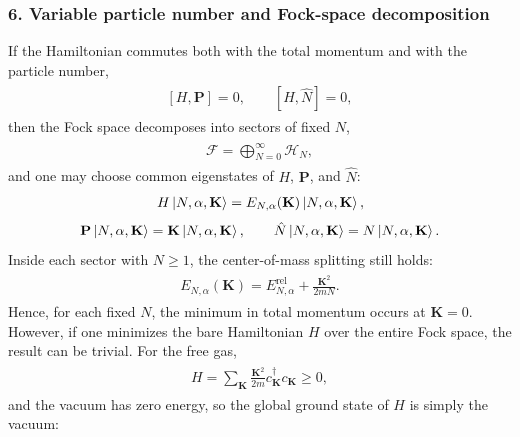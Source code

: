\documentclass[../QFT_main.tex]{subfiles}
\begin{document}
\subsubsection*{6. Variable particle number and Fock-space decomposition}
If the Hamiltonian commutes both with the total momentum and with the particle number,
{\small\begin{align}
\begin{aligned}
    [H,\mathbf{P}]=0,\qquad [H,\hat N]=0,
\end{aligned}
\end{align}}
then the Fock space decomposes into sectors of fixed $N$,
{\small\begin{align}
\begin{aligned}
    \mathcal F=\bigoplus_{N=0}^{\infty}\mathcal H_N,
\end{aligned}
\end{align}}
and one may choose common eigenstates of $H$, $\mathbf{P}$, and $\hat N$:
{\small\begin{align}
\begin{aligned}
    H\ket{N,\alpha,\mathbf{K}}=E_{N,\alpha}(\mathbf{K})\ket{N,\alpha,\mathbf{K}},
\end{aligned}
\end{align}}
{\small\begin{align}
\begin{aligned}
    \mathbf{P}\ket{N,\alpha,\mathbf{K}}=\mathbf{K}\ket{N,\alpha,\mathbf{K}},\qquad \hat N\ket{N,\alpha,\mathbf{K}}=N\ket{N,\alpha,\mathbf{K}}.
\end{aligned}
\end{align}}
Inside each sector with $N\geq 1$, the center-of-mass splitting still holds:
{\small\begin{align}
\begin{aligned}
    E_{N,\alpha}(\mathbf{K})=E^{\text{rel}}_{N,\alpha}+\frac{\mathbf{K}^2}{2mN}.
\end{aligned}
\end{align}}
Hence, for each fixed $N$, the minimum in total momentum occurs at $\mathbf{K}=0$.
However, if one minimizes the bare Hamiltonian $H$ over the entire Fock space, the result can be trivial.
For the free gas,
{\small\begin{align}
\begin{aligned}
    H=\sum_{\mathbf{K}}\frac{\mathbf{K}^2}{2m}c_{\mathbf{K}}^\dagger c_{\mathbf{K}}\geq 0,
\end{aligned}
\end{align}}
and the vacuum has zero energy, so the global ground state of $H$ is simply the vacuum:
\end{document}
